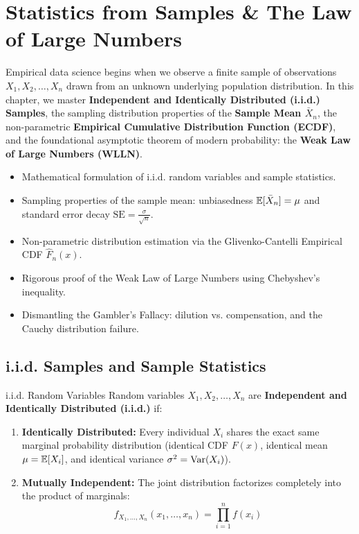 \chapter{Statistics from Samples \& The Law of Large Numbers}

Empirical data science begins when we observe a finite sample of observations $X_1, X_2, \dots, X_n$ drawn from an unknown underlying population distribution. In this chapter, we master \textbf{Independent and Identically Distributed (i.i.d.) Samples}, the sampling distribution properties of the \textbf{Sample Mean $\bar{X}_n$}, the non-parametric \textbf{Empirical Cumulative Distribution Function (ECDF)}, and the foundational asymptotic theorem of modern probability: the \textbf{Weak Law of Large Numbers (WLLN)}.

\vspace{0.5cm}
\begin{tcolorbox}[colback=primarylight, colframe=primarydark, title={\textbf{What You'll Learn in this Chapter}}]
\begin{itemize}
    \item Mathematical formulation of i.i.d. random variables and sample statistics.
    \item Sampling properties of the sample mean: unbiasedness $\mathbb{E}[\bar{X}_n] = \mu$ and standard error decay $\text{SE} = \frac{\sigma}{\sqrt{n}}$.
    \item Non-parametric distribution estimation via the Glivenko-Cantelli Empirical CDF $\hat{F}_n(x)$.
    \item Rigorous proof of the Weak Law of Large Numbers using Chebyshev's inequality.
    \item Dismantling the Gambler's Fallacy: dilution vs. compensation, and the Cauchy distribution failure.
\end{itemize}
\end{tcolorbox}

\section{i.i.d. Samples and Sample Statistics}

\begin{definitionbox}{i.i.d. Random Variables}
Random variables $X_1, X_2, \dots, X_n$ are \textbf{Independent and Identically Distributed (i.i.d.)} if:
\begin{enumerate}
    \item \textbf{Identically Distributed:} Every individual $X_i$ shares the exact same marginal probability distribution (identical CDF $F(x)$, identical mean $\mu = \mathbb{E}[X_i]$, and identical variance $\sigma^2 = \operatorname{Var}(X_i)$).
    \item \textbf{Mutually Independent:} The joint distribution factorizes completely into the product of marginals:
    $$f_{X_1, \dots, X_n}(x_1, \dots, x_n) = \prod_{i=1}^n f(x_i)$$
\end{enumerate}
\end{definitionbox}

